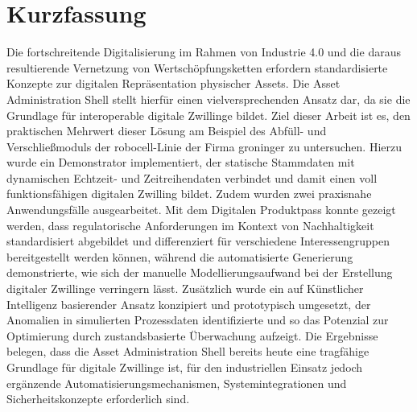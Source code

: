 \newpage
{}
{}
\section*{Kurzfassung}

Die fortschreitende Digitalisierung im Rahmen von Industrie 4.0 und die daraus resultierende Vernetzung von Wertschöpfungsketten erfordern standardisierte Konzepte zur digitalen Repräsentation physischer Assets. 
Die Asset Administration Shell stellt hierfür einen vielversprechenden Ansatz dar, da sie die Grundlage für interoperable digitale Zwillinge bildet. 
Ziel dieser Arbeit ist es, den praktischen Mehrwert dieser Lösung am Beispiel des Abfüll- und Verschließmoduls der robocell-Linie der Firma groninger zu untersuchen. 
Hierzu wurde ein Demonstrator implementiert, der statische Stammdaten mit dynamischen Echtzeit- und Zeitreihendaten verbindet und damit einen voll funktionsfähigen digitalen Zwilling bildet. 
Zudem wurden zwei praxisnahe Anwendungsfälle ausgearbeitet. 
Mit dem Digitalen Produktpass konnte gezeigt werden, dass regulatorische Anforderungen im Kontext von Nachhaltigkeit standardisiert abgebildet und differenziert für verschiedene Interessengruppen bereitgestellt werden können, während die automatisierte Generierung demonstrierte, wie sich der manuelle Modellierungsaufwand bei der Erstellung digitaler Zwillinge verringern lässt. 
Zusätzlich wurde ein auf Künstlicher Intelligenz basierender Ansatz konzipiert und prototypisch umgesetzt, der Anomalien in simulierten Prozessdaten identifizierte und so das Potenzial zur Optimierung durch zustandsbasierte Überwachung aufzeigt. 
Die Ergebnisse belegen, dass die Asset Administration Shell bereits heute eine tragfähige Grundlage für digitale Zwillinge ist, für den industriellen Einsatz jedoch ergänzende Automatisierungsmechanismen, Systemintegrationen und Sicherheitskonzepte erforderlich sind.

